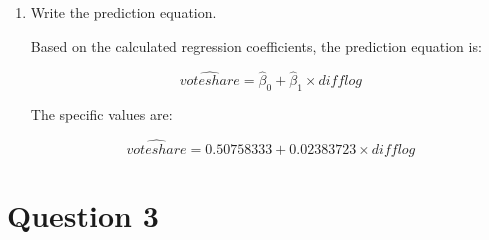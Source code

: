 \documentclass[12pt,letterpaper]{article}
\begin{document}
\begin{enumerate}
		\vspace{.5cm}
		 
		\vspace{.5cm}
		
		\item Write the prediction equation.
		
		\vspace{.5cm}
		Based on the calculated regression coefficients, the prediction equation is:
		
		$$
		\hat{voteshare} = \hat{\beta}_0 + \hat{\beta}_1 \times difflog
		$$
		
		The specific values are:
		
		$$
		\hat{voteshare} = 0.50758333 + 0.02383723 \times difflog
		$$
		
	\end{enumerate}
	
	\newpage	
\section*{Question 3}
\end{document}
